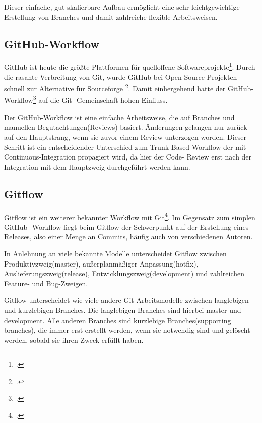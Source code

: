 Dieser einfache, gut skalierbare Aufbau ermöglicht eine sehr leichtgewichtige Erstellung von Branches und damit 
zahlreiche flexible Arbeitsweisen.

\subsection{GitHub-Workflow}

GitHub ist heute die größte Plattformen für quelloffene Softwareprojekte\footcite[vgl.][]{github-marketshare-datanyze}. Durch die 
rasante Verbreitung von Git, wurde GitHub bei Open-Source-Projekten schnell zur Alternative für Sourceforge
\footcite[vgl.][]{heise-github-2011}. Damit einhergehend hatte der GitHub-Workflow\footcite[vgl.][]{github-workflow-intro} auf die Git-
Gemeinschaft hohen Einfluss.

Der GitHub-Workflow ist eine einfache Arbeitsweise, die auf Branches und manuellen Begutachtungen(Reviews) basiert. 
Änderungen gelangen nur zurück auf den Hauptstrang, wenn sie zuvor einem Review unterzogen worden. Dieser Schritt ist ein 
entscheidender Unterschied zum Trunk-Based-Workflow der mit Continuous-Integration propagiert wird, da hier der Code-
Review erst nach der Integration mit dem Hauptzweig durchgeführt werden kann.

\subsection{Gitflow}
\label{subsec:gitflow}

Gitflow ist ein weiterer bekannter Workflow mit Git\footcite[vgl.][]{nvie-git-branch-model}. Im Gegensatz zum simplen GitHub-
Workflow liegt beim Gitflow der Schwerpunkt auf der Erstellung eines Releases, also einer Menge an Commits, häufig auch
von verschiedenen Autoren.

In Anlehnung an viele bekannte Modelle unterscheidet Gitflow zwischen Produktivzweig(master), außerplanmäßiger 
Anpassung(hotfix), Auslieferungszweig(release), Entwicklungszweig(development) und zahlreichen Feature- und Bug-Zweigen.

Gitflow unterscheidet wie viele andere Git-Arbeitsmodelle zwischen langlebigen und kurzlebigen Branches. Die langlebigen 
Branches sind hierbei \glqq master\grqq{} und \glqq development\grqq{}. Alle anderen Branches sind kurzlebige Branches(\glqq supporting
branches\grqq{}), die immer erst erstellt werden, wenn sie notwendig sind und gelöscht werden, sobald sie ihren Zweck erfüllt
haben.

